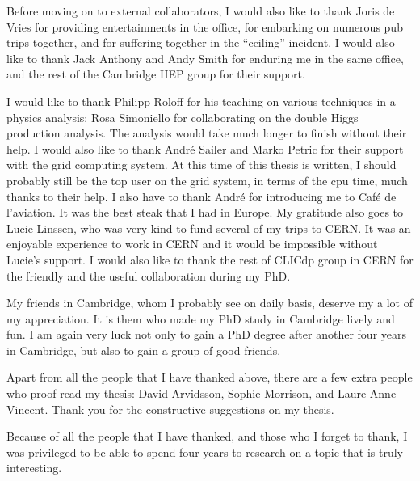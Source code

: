 \begin{acknowledgements}
Before moving on to external collaborators, I would also like to thank Joris de Vries for providing entertainments in the office, for embarking on numerous pub trips together, and for suffering together in the ``ceiling'' incident. I would also like to thank Jack Anthony and Andy Smith for enduring me in the same office, and the rest of the Cambridge HEP group for their support.

I would like to thank Philipp Roloff for his teaching on various techniques in a physics analysis; Rosa Simoniello for collaborating on the double Higgs production analysis. The analysis would take much longer to finish without their help. I would also like to thank Andr\'{e} Sailer and Marko Petric for their support with the \CLIC grid computing system. At this time of this thesis is written, I should probably still be the top user on the grid system, in terms of the cpu time, much thanks to their help. I also have to thank Andr\'{e} for introducing me to Caf\'{e} de l'aviation. It was the best steak that I had in Europe. My gratitude also goes to Lucie Linssen, who was very kind to fund several of my trips to CERN. It was an enjoyable experience to work in CERN and it would be impossible without Lucie's support. I would also like to thank the rest of CLICdp group in CERN for the friendly and the useful collaboration during my PhD.

My friends in Cambridge, whom I probably see on daily basis, deserve my a lot of my appreciation. It is them who made my PhD study in Cambridge lively and fun. I am again very luck not only to gain a PhD degree after another four years in Cambridge, but also to gain a group of good friends.

Apart from all the people that I have thanked above, there are a few extra people who proof-read my thesis: David Arvidsson, Sophie Morrison, and Laure-Anne Vincent. Thank you for the constructive suggestions on my thesis.

Because of all the people that I have thanked, and those who I forget to thank, I was privileged to be able to spend four years to research on a topic that is truly interesting.


\end{acknowledgements}



